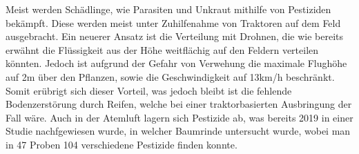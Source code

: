 Meist werden Schädlinge, wie Parasiten und Unkraut mithilfe von Pestiziden
bekämpft. Diese werden meist unter Zuhilfenahme von Traktoren auf dem Feld
ausgebracht. Ein neuerer Ansatz ist die Verteilung mit Drohnen, die wie bereits
erwähnt die Flüssigkeit aus der Höhe weitflächig auf den Feldern verteilen
könnten. Jedoch ist aufgrund der Gefahr von Verwehung die maximale Flughöhe auf
2m über den Pflanzen, sowie die Geschwindigkeit auf 13km/h
beschränkt.\cite{bvl} Somit erübrigt sich dieser Vorteil, was jedoch bleibt ist
die fehlende Bodenzerstörung durch Reifen, welche bei einer traktorbasierten
Ausbringung der Fall wäre. Auch in der Atemluft lagern sich Pestizide ab, was
bereits 2019 in einer Studie nachfgewiesen wurde, in welcher Baumrinde
untersucht wurde, wobei man in 47 Proben 104 verschiedene Pestizide finden
konnte.\cite{clausing2020baumrinden}
